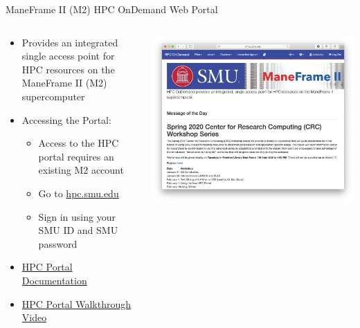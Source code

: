 \begin{frame}{ManeFrame II (M2) HPC OnDemand Web Portal}
\begin{columns}[c]
\begin{column}{0.5\textwidth}
\begin{itemize}
\item Provides an integrated single access point for HPC resources on the
ManeFrame II (M2) supercomputer
\item Accessing the Portal:
\begin{itemize}
\item Access to the HPC portal requires an existing M2 account
\item Go to \url{hpc.smu.edu}
\item Sign in using your SMU ID and SMU password
\end{itemize}
\item \href{https://s2.smu.edu/hpc/documentation/portal.html}{HPC Portal
Documentation}
\item
\href{https://s2.smu.edu/hpc/documentation/portal.html\#remote-desktop}{HPC
Portal Walkthrough Video}
\end{itemize}
\end{column}
\begin{column}{0.5\textwidth}
\includegraphics[width=\linewidth]{figures/portal.png}
\end{column}
\end{columns}
\end{frame}

